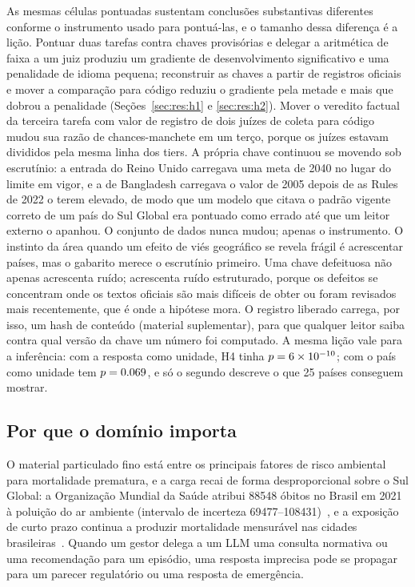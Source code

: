 As mesmas células pontuadas sustentam conclusões substantivas diferentes
conforme o instrumento usado para pontuá-las, e o tamanho dessa diferença é a
lição. Pontuar duas tarefas contra chaves provisórias e delegar a aritmética de
faixa a um juiz produziu um gradiente de desenvolvimento significativo e uma
penalidade de idioma pequena; reconstruir as chaves a partir de registros
oficiais e mover a comparação para código reduziu o gradiente pela metade e
mais que dobrou a penalidade (Seções~\ref{sec:res:h1} e \ref{sec:res:h2}).
Mover o veredito factual da terceira tarefa com valor de registro de dois
juízes de coleta para código mudou sua razão de chances-manchete em um terço,
porque os juízes estavam divididos pela mesma linha dos tiers. A própria chave
continuou se movendo sob escrutínio: a entrada do Reino Unido carregava uma
meta de 2040 no lugar do limite em vigor, e a de Bangladesh carregava o valor
de 2005 depois de as Rules de 2022 o terem elevado, de modo que um modelo que
citava o padrão vigente correto de um país do Sul Global era pontuado como
errado até que um leitor externo o apanhou. O conjunto de dados nunca mudou;
apenas o instrumento. O instinto da área quando um efeito de viés geográfico se
revela frágil é acrescentar países, mas o gabarito merece o escrutínio
primeiro. Uma chave defeituosa não apenas acrescenta ruído; acrescenta ruído
estruturado, porque os defeitos se concentram onde os textos oficiais são mais
difíceis de obter ou foram revisados mais recentemente, que é onde a hipótese
mora. O registro liberado carrega, por isso, um hash de conteúdo (material
suplementar), para que qualquer leitor saiba contra qual versão da chave um
número foi computado. A mesma lição vale para a inferência: com a resposta como
unidade, H4 tinha $p=6\times10^{-10}$; com o país como unidade tem $p=0.069$, e
só o segundo descreve o que 25 países conseguem mostrar.

\subsection{Por que o domínio importa}

O material particulado fino está entre os principais fatores de risco
ambiental para mortalidade prematura, e a carga recai de forma desproporcional
sobre o Sul Global: a Organização Mundial da Saúde atribui \num{88548} óbitos
no Brasil em 2021 à poluição do ar ambiente (intervalo de incerteza
\numrange{69477}{108431})~\citep{who2026gho_air41}, e a exposição de curto prazo
continua a produzir mortalidade mensurável nas cidades
brasileiras~\citep{requia2024shortterm}. Quando um gestor delega a um LLM uma
consulta normativa ou uma recomendação para um episódio, uma resposta imprecisa
pode se propagar para um parecer regulatório ou uma resposta de emergência.


